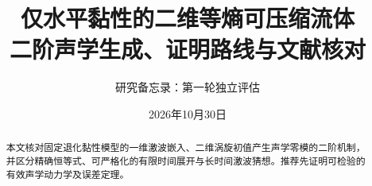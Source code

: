 \documentclass[UTF8,fontset=fandol,11pt,a4paper]{ctexart}
\title{仅水平黏性的二维等熵可压缩流体\\二阶声学生成、证明路线与文献核对}
\author{研究备忘录：第一轮独立评估}
\date{2026年10月30日}
\theoremstyle{remark}
\begin{document}
\maketitle
\begin{abstract}
本文核对固定退化黏性模型的一维激波嵌入、二维涡旋初值产生声学零模的二阶机制，并区分精确恒等式、可严格化的有限时间展开与长时间激波猜想。推荐先证明可检验的有效声学动力学及误差定理。
\end{abstract}
\tableofcontents




\end{document}
